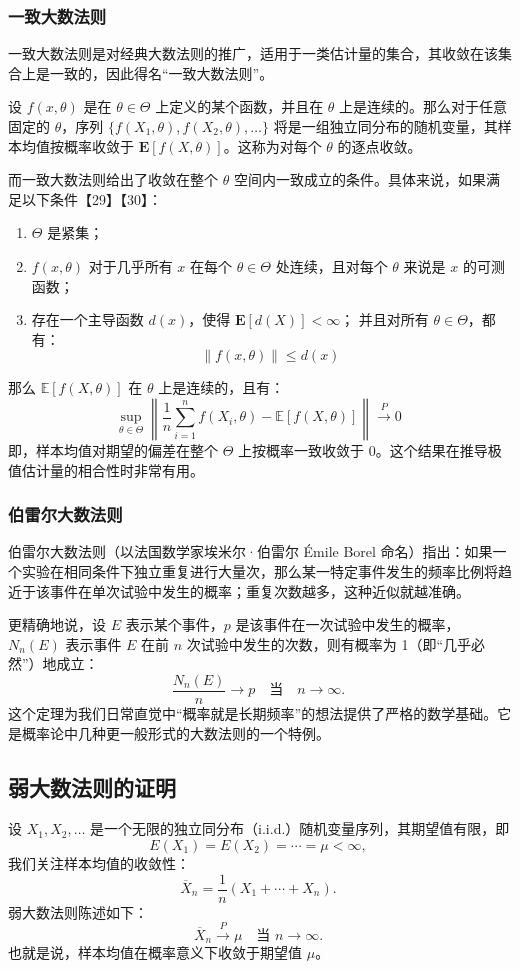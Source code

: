 \subsubsection{一致大数法则}
一致大数法则是对经典大数法则的推广，适用于一类估计量的集合，其收敛在该集合上是一致的，因此得名“一致大数法则”。

设 $f(x, \theta)$ 是在 $\theta \in \Theta$ 上定义的某个函数，并且在 $\theta$ 上是连续的。那么对于任意固定的 $\theta$，序列 $\{f(X_1, \theta), f(X_2, \theta), \dots\}$ 将是一组独立同分布的随机变量，其样本均值按概率收敛于 $\mathbf{E}[f(X, \theta)]$。这称为对每个 $\theta$ 的逐点收敛。

而一致大数法则给出了收敛在整个 $\theta$ 空间内一致成立的条件。具体来说，如果满足以下条件【29】【30】：
\begin{enumerate}
\item $\Theta$ 是紧集；
\item $f(x, \theta)$ 对于几乎所有 $x$ 在每个 $\theta \in \Theta$ 处连续，且对每个 $\theta$ 来说是 $x$ 的可测函数；
\item 存在一个主导函数 $d(x)$，使得 $\mathbf{E}[d(X)] < \infty$；
并且对所有 $\theta \in \Theta$，都有：
   $$
   \| f(x, \theta) \| \leq d(x)~
   $$
\end{enumerate}
那么 $\mathbb{E}[f(X, \theta)]$ 在 $\theta$ 上是连续的，且有：
$$
\sup_{\theta \in \Theta} \left\| \frac{1}{n} \sum_{i=1}^{n} f(X_i, \theta) - \mathbb{E}[f(X, \theta)] \right\| \xrightarrow{P} 0~
$$
即，样本均值对期望的偏差在整个 $\Theta$ 上按概率一致收敛于 0。这个结果在推导极值估计量的相合性时非常有用。
\subsubsection{伯雷尔大数法则}
伯雷尔大数法则（以法国数学家埃米尔·伯雷尔 Émile Borel 命名）指出：如果一个实验在相同条件下独立重复进行大量次，那么某一特定事件发生的频率比例将趋近于该事件在单次试验中发生的概率；重复次数越多，这种近似就越准确。

更精确地说，设 $E$ 表示某个事件，$p$ 是该事件在一次试验中发生的概率，$N_n(E)$ 表示事件 $E$ 在前 $n$ 次试验中发生的次数，则有概率为 1（即“几乎必然”）地成立：
$$
\frac{N_n(E)}{n} \to p \quad \text{当} \quad n \to \infty.~
$$
这个定理为我们日常直觉中“概率就是长期频率”的想法提供了严格的数学基础。它是概率论中几种更一般形式的大数法则的一个特例。
\subsection{弱大数法则的证明}
设 $X_1, X_2, \ldots$ 是一个无限的独立同分布（i.i.d.）随机变量序列，其期望值有限，即
$$
E(X_1) = E(X_2) = \cdots = \mu < \infty,~
$$
我们关注样本均值的收敛性：
$$
\overline{X}_n = \frac{1}{n}(X_1 + \cdots + X_n).~
$$
弱大数法则陈述如下：
$$
\overline{X}_n \overset{P}{\longrightarrow} \mu \quad \text{当 } n \to \infty.~
$$
也就是说，样本均值在概率意义下收敛于期望值 $\mu$。
